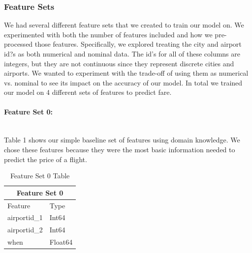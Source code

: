 \documentclass{article}
\begin{document}
\subsubsection{Feature Sets}
We had several different feature sets that we created to train our model on. We experimented with both the number of features included and how we pre-processed those features. Specifically, we explored treating the city and airport id?s as both numerical and nominal data. The id's for all of these columns are integers, but they are not continuous since they represent discrete cities and airports. We wanted to experiment with the trade-off of using them as numerical vs. nominal to see its impact on the accuracy of our model. In total we trained our model on 4 different sets of features to predict fare. 


\paragraph{Feature Set 0:}
\\Table 1 shows our simple baseline set of features using domain knowledge. We chose these features because they were the most basic information needed to predict the price of a flight.
\begin{table}[h!]
\centering
\begin{tabular}{ |p{3cm}||p{3cm}|  }
 \hline
 \multicolumn{2}{|c|}{Feature Set 0} \\
 \hline Feature & Type\\
 \hline
airportid\_1 & Int64 \\ 
airportid\_2 & Int64 \\
when & Float64 \\
 \hline
\end{tabular}
\caption{Feature Set 0 Table}
\label{table:1}
\end{table}
\end{document}
